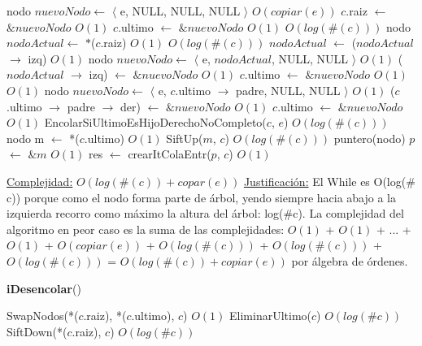 \begin{Algoritmos}
\begin{algorithmic}[1]
        \State nodo $nuevoNodo \gets$ $\langle$ e, NULL, NULL, NULL $\rangle$   \Comment $O(copiar(e))$
        \State $c$.raiz $\gets$ $\& nuevoNodo$ \Comment $O(1)$
        \State $c$.ultimo $\gets$ $\& nuevoNodo$ \Comment $O(1)$
    \Else
          \Comment $O(log(\#(c)))$
            \State nodo $nodoActual \gets$ $*$($c$.raiz) \Comment $O(1)$
              \Comment $O(log(\#(c)))$
                \State $nodoActual$ $\gets$ ($nodoActual$ $\to$ izq)  \Comment $O(1)$
            \EndWhile
            \State nodo $nuevoNodo \gets$ $\langle$ e, $nodoActual$, NULL, NULL $\rangle$   \Comment $O(1)$
            \State ($nodoActual$ $\to$ izq) $\gets$ $\& nuevoNodo$ \Comment $O(1)$
            \State $c$.ultimo $\gets$ $\& nuevoNodo$ \Comment $O(1)$
        \Else
              \Comment $O(1)$
                \State nodo $nuevoNodo \gets$ $\langle$ e, $c$.ultimo $\to$ padre, NULL, NULL $\rangle$   \Comment $O(1)$
                \State ($c$.ultimo $\to$ padre $\to$ der) $\gets$ $\& nuevoNodo$ \Comment $O(1)$
                \State $c$.ultimo $\gets$ $\& nuevoNodo$ \Comment $O(1)$
            \Else %
                \State EncolarSiUltimoEsHijoDerechoNoCompleto($c$, $e$) \Comment $O(log(\#(c)))$
            \EndIf
        \EndIf
    \EndIf
    \State nodo m $\gets$ *($c$.ultimo) \Comment $O(1)$
    \State SiftUp($m$, $c$) \Comment $O(log(\#(c)))$
    \State puntero(nodo) $p$ $\gets$ $\&m$ \Comment $O(1)$
    \State res $\gets$ crearItColaEntr($p$, $c$) \Comment $O(1)$

    \medskip
    \Statex \underline{Complejidad:} $O(log(\#(c)) + copar(e))$
    \Statex \underline{Justificaci\'on:} El While es O(log($\#$c)) porque como el nodo forma parte de \'arbol, yendo siempre hacia abajo a la izquierda recorro como m\'aximo la altura del \'arbol: log($\#$c). La complejidad del algoritmo en peor caso es la suma de las complejidades: $O(1)$ + $O(1)$ + ... + $O(1)$ + $O(copiar(e))$ + $O(log(\#(c)))$ + $O(log(\#(c)))$ + $O(log(\#(c)))$ = $O(log(\#(c)) + copiar(e))$ por \'algebra de \'ordenes.
\end{algorithmic}


\begin{algorithm}[H]
{\textbf{iDesencolar}()}
\begin{algorithmic}[1]
    
    \State SwapNodos(*($c$.raiz), *($c$.ultimo), $c$) \Comment $O(1)$
    \State EliminarUltimo($c$) \Comment $O(log(\#c))$
    \State SiftDown(*($c$.raiz), $c$) \Comment $O(log(\#c))$
    

\end{algorithmic}
\end{algorithm}
\end{Algoritmos}
